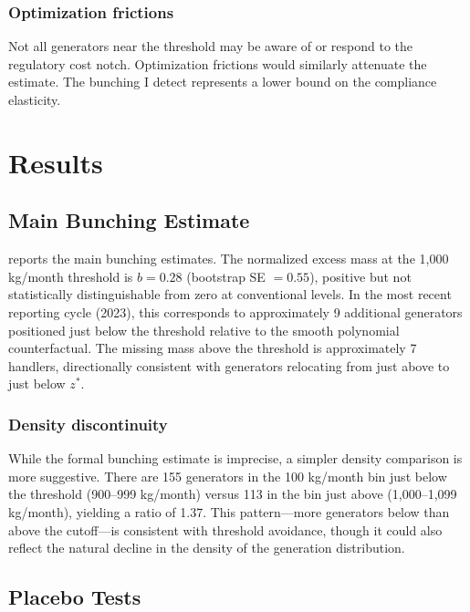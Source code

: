 \documentclass[12pt]{article}
\begin{document}
\subsubsection*{Optimization frictions} Not all generators near the threshold may be aware of or respond to the regulatory cost notch. Optimization frictions \citep{chetty2011} would similarly attenuate the estimate. The bunching I detect represents a lower bound on the compliance elasticity.


\section{Results}
\label{sec:results}

\subsection{Main Bunching Estimate}



 reports the main bunching estimates. The normalized excess mass at the 1,000 kg/month threshold is $b = 0.28$ (bootstrap SE $= 0.55$), positive but not statistically distinguishable from zero at conventional levels. In the most recent reporting cycle (2023), this corresponds to approximately 9 additional generators positioned just below the threshold relative to the smooth polynomial counterfactual. The missing mass above the threshold is approximately 7 handlers, directionally consistent with generators relocating from just above to just below $z^*$.

\subsubsection*{Density discontinuity} While the formal bunching estimate is imprecise, a simpler density comparison is more suggestive. There are 155 generators in the 100 kg/month bin just below the threshold (900--999 kg/month) versus 113 in the bin just above (1,000--1,099 kg/month), yielding a ratio of 1.37. This pattern---more generators below than above the cutoff---is consistent with threshold avoidance, though it could also reflect the natural decline in the density of the generation distribution.

\subsection{Placebo Tests}
\end{document}
